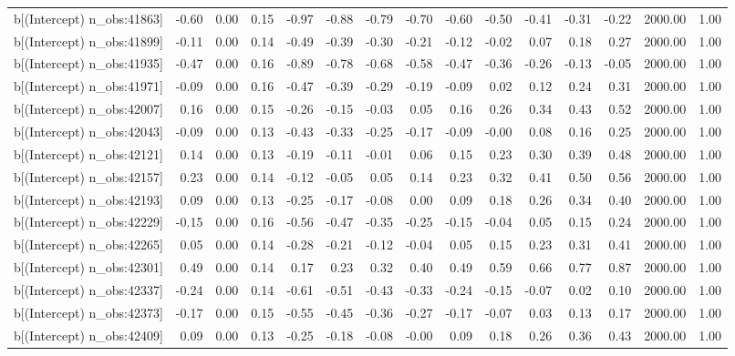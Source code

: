 \begin{table}[ht]
\begin{tabular}{rrrrrrrrrrrrrrr}
  b[(Intercept) n\_obs:41863] & -0.60 & 0.00 & 0.15 & -0.97 & -0.88 & -0.79 & -0.70 & -0.60 & -0.50 & -0.41 & -0.31 & -0.22 & 2000.00 & 1.00 \\ 
  b[(Intercept) n\_obs:41899] & -0.11 & 0.00 & 0.14 & -0.49 & -0.39 & -0.30 & -0.21 & -0.12 & -0.02 & 0.07 & 0.18 & 0.27 & 2000.00 & 1.00 \\ 
  b[(Intercept) n\_obs:41935] & -0.47 & 0.00 & 0.16 & -0.89 & -0.78 & -0.68 & -0.58 & -0.47 & -0.36 & -0.26 & -0.13 & -0.05 & 2000.00 & 1.00 \\ 
  b[(Intercept) n\_obs:41971] & -0.09 & 0.00 & 0.16 & -0.47 & -0.39 & -0.29 & -0.19 & -0.09 & 0.02 & 0.12 & 0.24 & 0.31 & 2000.00 & 1.00 \\ 
  b[(Intercept) n\_obs:42007] & 0.16 & 0.00 & 0.15 & -0.26 & -0.15 & -0.03 & 0.05 & 0.16 & 0.26 & 0.34 & 0.43 & 0.52 & 2000.00 & 1.00 \\ 
  b[(Intercept) n\_obs:42043] & -0.09 & 0.00 & 0.13 & -0.43 & -0.33 & -0.25 & -0.17 & -0.09 & -0.00 & 0.08 & 0.16 & 0.25 & 2000.00 & 1.00 \\ 
  b[(Intercept) n\_obs:42121] & 0.14 & 0.00 & 0.13 & -0.19 & -0.11 & -0.01 & 0.06 & 0.15 & 0.23 & 0.30 & 0.39 & 0.48 & 2000.00 & 1.00 \\ 
  b[(Intercept) n\_obs:42157] & 0.23 & 0.00 & 0.14 & -0.12 & -0.05 & 0.05 & 0.14 & 0.23 & 0.32 & 0.41 & 0.50 & 0.56 & 2000.00 & 1.00 \\ 
  b[(Intercept) n\_obs:42193] & 0.09 & 0.00 & 0.13 & -0.25 & -0.17 & -0.08 & 0.00 & 0.09 & 0.18 & 0.26 & 0.34 & 0.40 & 2000.00 & 1.00 \\ 
  b[(Intercept) n\_obs:42229] & -0.15 & 0.00 & 0.16 & -0.56 & -0.47 & -0.35 & -0.25 & -0.15 & -0.04 & 0.05 & 0.15 & 0.24 & 2000.00 & 1.00 \\ 
  b[(Intercept) n\_obs:42265] & 0.05 & 0.00 & 0.14 & -0.28 & -0.21 & -0.12 & -0.04 & 0.05 & 0.15 & 0.23 & 0.31 & 0.41 & 2000.00 & 1.00 \\ 
  b[(Intercept) n\_obs:42301] & 0.49 & 0.00 & 0.14 & 0.17 & 0.23 & 0.32 & 0.40 & 0.49 & 0.59 & 0.66 & 0.77 & 0.87 & 2000.00 & 1.00 \\ 
  b[(Intercept) n\_obs:42337] & -0.24 & 0.00 & 0.14 & -0.61 & -0.51 & -0.43 & -0.33 & -0.24 & -0.15 & -0.07 & 0.02 & 0.10 & 2000.00 & 1.00 \\ 
  b[(Intercept) n\_obs:42373] & -0.17 & 0.00 & 0.15 & -0.55 & -0.45 & -0.36 & -0.27 & -0.17 & -0.07 & 0.03 & 0.13 & 0.17 & 2000.00 & 1.00 \\ 
  b[(Intercept) n\_obs:42409] & 0.09 & 0.00 & 0.13 & -0.25 & -0.18 & -0.08 & -0.00 & 0.09 & 0.18 & 0.26 & 0.36 & 0.43 & 2000.00 & 1.00 \\ 

\end{tabular}
\end{table}
